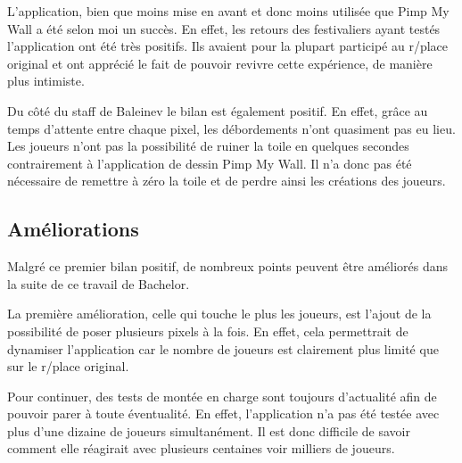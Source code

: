 L'application, bien que moins mise en avant et donc moins utilisée que Pimp My Wall a été selon moi un succès. En effet, les retours des festivaliers ayant testés l'application ont été très positifs. Ils avaient pour la plupart participé au r/place original et ont apprécié le fait de pouvoir revivre cette expérience, de manière plus intimiste.

Du côté du staff de Baleinev le bilan est également positif. En effet, grâce au temps d'attente entre chaque pixel, les débordements n'ont quasiment pas eu lieu. Les joueurs n'ont pas la possibilité de ruiner la toile en quelques secondes contrairement à l'application de dessin Pimp My Wall. Il n'a donc pas été nécessaire de remettre à zéro la toile et de perdre ainsi les créations des joueurs.

\subsection{Améliorations}

Malgré ce premier bilan positif, de nombreux points peuvent être améliorés dans la suite de ce travail de Bachelor.

La première amélioration, celle qui touche le plus les joueurs, est l'ajout de la possibilité de poser plusieurs pixels à la fois. En effet, cela permettrait de dynamiser l'application car le nombre de joueurs est clairement plus limité que sur le r/place original.

Pour continuer, des tests de montée en charge sont toujours d'actualité afin de pouvoir parer à toute éventualité. En effet, l'application n'a pas été testée avec plus d'une dizaine de joueurs simultanément. Il est donc difficile de savoir comment elle réagirait avec plusieurs centaines voir milliers de joueurs.

